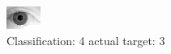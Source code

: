 \begin{figure}[h!]
\begin{center}
\includegraphics[width=0.60\columnwidth]{figures/ID2130_class_4_target_3.png}
\end{center}
\caption{ Classification: 4 actual target: 3}
\label{fig:ID2130_class_4_target_3}
\end{figure}
